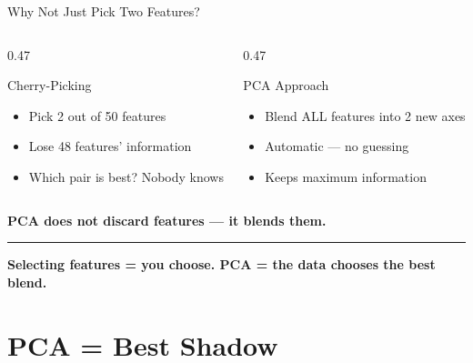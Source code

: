 \documentclass[8pt,aspectratio=169]{beamer}
\newcommand{\bottomnote}[1]{%
\vfill
\vspace{-2mm}
\textcolor{mllavender2}{\rule{\textwidth}{0.4pt}}
\vspace{1mm}
\footnotesize
\textbf{#1}
}
\newenvironment{compactlist}{%
  \begin{itemize}%
    \setlength{\itemsep}{2pt}%
    \setlength{\parskip}{0pt}%
    \setlength{\parsep}{0pt}%
}{%
  \end{itemize}%
}
\newcommand{\highlight}[1]{\textcolor{mlorange}{\textbf{#1}}}
\begin{document}
\begin{frame}{Why Not Just Pick Two Features?}
\begin{columns}[T]
\begin{column}{0.47\textwidth}
\begin{block}{\textcolor{mlred}{Cherry-Picking}}
\begin{compactlist}
  \item Pick 2 out of 50 features
  \item Lose 48 features' information
  \item Which pair is best? Nobody knows
\end{compactlist}
\end{block}
\end{column}
\begin{column}{0.47\textwidth}
\begin{block}{\textcolor{mlgreen}{PCA Approach}}
\begin{compactlist}
  \item Blend ALL features into 2 new axes
  \item Automatic --- no guessing
  \item Keeps maximum information
\end{compactlist}
\end{block}
\end{column}
\end{columns}

\vspace{4mm}
\centering
\highlight{PCA does not discard features --- it blends them.}

\bottomnote{Selecting features = you choose. PCA = the data chooses the best blend.}
\end{frame}

\section{PCA = Best Shadow}
\end{document}
